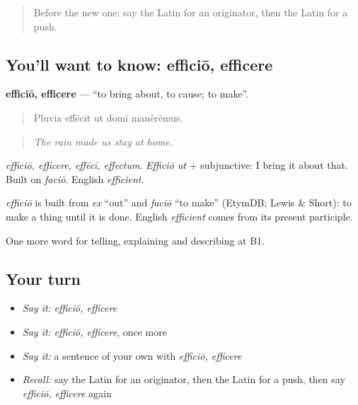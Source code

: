 \label{lesson:LA-C372-efficio}



\begin{quote}
Before the new one: say the Latin for an originator, then the Latin for a push.
\end{quote}

\subsection*{You'll want to know: efficiō, efficere}
\textbf{efficiō, efficere} — \textquotedblleft{}to bring about, to cause; to make\textquotedblright{}.

\begin{quote}
Pluvia effēcit ut domī manērēmus.
\end{quote}

\begin{quote}
\emph{The rain made us stay at home.}
\end{quote}

\emph{efficiō, efficere, effēcī, effectum}. \emph{Efficiō ut} + subjunctive: I bring it about that. Built on \emph{faciō}. English \emph{efficient}.

\begin{cousinweb}
\emph{efficiō} is built from \emph{ex} \textquotedblleft{}out\textquotedblright{} and \emph{faciō} \textquotedblleft{}to make\textquotedblright{} (EtymDB; Lewis \& Short): to make a thing until it is done. English \emph{efficient} comes from its present participle.
\end{cousinweb}

\begin{grammarlens}[title={What you've built}]
One more word for telling, explaining and describing at B1.
\end{grammarlens}

\subsection*{Your turn}
\begin{itemize}
\raggedright
  \item \emph{Say it:} \emph{efficiō, efficere}
  \item \emph{Say it:} \emph{efficiō, efficere}, once more
  \item \emph{Say it:} a sentence of your own with \emph{efficiō, efficere}
  \item \emph{Recall:} say the Latin for an originator, then the Latin for a push, then say \emph{efficiō, efficere} again
\end{itemize}


